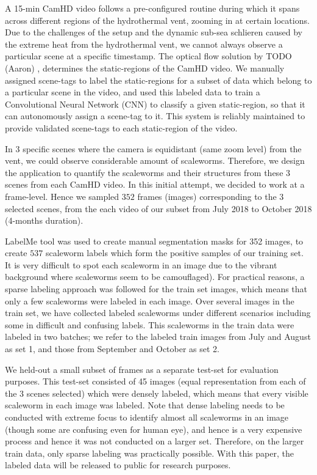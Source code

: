 \documentclass[10pt,twocolumn,letterpaper]{article}
\begin{document}
A 15-min CamHD video follows a pre-configured routine during which it spans across different regions of the hydrothermal vent, zooming in at certain locations. Due to the challenges of the setup and the dynamic sub-sea schlieren caused by the extreme heat from the hydrothermal vent, we cannot always observe a particular scene at a specific timestamp. The optical flow solution by TODO (Aaron) \etal \cite{aaron_prevwork}, determines the static-regions of the CamHD video. We manually assigned scene-tags to label the static-regions for a subset of data which belong to a particular scene in the video, and used this labeled data to train a Convolutional Neural Network (CNN) to classify a given static-region, so that it can autonomously assign a scene-tag to it. This system is reliably maintained to provide validated scene-tags to each static-region of the video.

In 3 specific scenes where the camera is equidistant (same zoom level) from the vent, we could observe considerable amount of scaleworms. Therefore, we design the application to quantify the scaleworms and their structures from these 3 scenes from each CamHD video. In this initial attempt, we decided to work at a frame-level. Hence we sampled $352$ frames (images) corresponding to the 3 selected scenes, from the each video of our subset from July 2018 to October 2018 (4-months duration).

LabelMe tool \cite{labelme} was used to create manual segmentation masks for 352 images, to create $537$ scaleworm labels which form the positive samples of our training set. It is very difficult to spot each scaleworm in an image due to the vibrant background where scaleworms seem to be camouflaged). For practical reasons, a sparse labeling approach was followed for the train set images, which means that only a few scaleworms were labeled in each image. Over several images in the train set, we have collected labeled scaleworms under different scenarios including some in difficult and confusing labels. This scaleworms in the train data were labeled in two batches; we refer to the labeled train images from July and August as set 1, and those from September and October as set 2.

We held-out a small subset of frames as a separate test-set for evaluation purposes. This test-set consisted of 45 images (equal representation from each of the 3 scenes selected) which were densely labeled, which means that every visible scaleworm in each image was labeled. Note that dense labeling needs to be conducted with extreme focus to identify almost all scaleworms in an image (though some are confusing even for human eye), and hence is a very expensive process and hence it was not conducted on a larger set. Therefore, on the larger train data, only sparse labeling was practically possible. With this paper, the labeled data will be released to public for research purposes.
\end{document}
